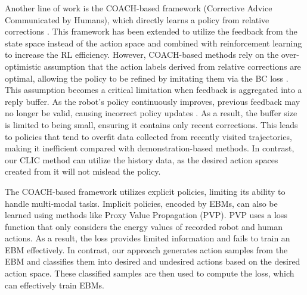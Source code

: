 Another line of work is the COACH-based framework (Corrective Advice Communicated by Humans), which directly learns a policy from relative corrections
\cite{2018_D_COACH, 2019_Carlos_COACH, 2021_BDCOACH}.
This framework has been extended to 
 utilize the feedback from the state space instead of the action space 
\cite{2020_COACH_state_Space} and combined with reinforcement learning to increase the RL efficiency\cite{2019_Carlos_IJRR}.
However, COACH-based methods rely on the over-optimistic assumption that the action labels derived from relative corrections are optimal, allowing the policy to be refined by imitating them via the BC loss \cite{2019_Rodrigo_D_COACH, 2019_Carlos_IJRR, 2019_Carlos_COACH}. 
This assumption becomes a critical limitation when feedback is aggregated into a reply buffer.  
As the robot's policy continuously improves, previous feedback may no longer be valid, causing incorrect policy updates \cite{2021_BDCOACH}. 
As a result, the buffer size is limited to being small, ensuring it contains only recent corrections. This leads to policies that tend to overfit data collected from recently visited trajectories, making it inefficient compared with demonstration-based methods. 
In contrast, our CLIC method can utilize the history data, as the desired action spaces created from it will not mislead the policy. 

The COACH-based framework utilizes explicit policies\cite{2019_Carlos_IJRR, 2019_Rodrigo_D_COACH}, limiting its ability to handle multi-modal tasks. 
Implicit policies, encoded by
EBMs, can also be learned using methods like Proxy Value Propagation (PVP)\cite{2023_NIPS_PVP}.
PVP uses a loss function that only considers the energy values of recorded robot and human actions. As a result, the loss provides limited information and fails to train an EBM effectively.
In contrast, our approach generates action samples from the EBM and classifies them into desired and undesired actions based on the desired action space. These classified samples are then used to compute the loss, which can effectively train EBMs.






